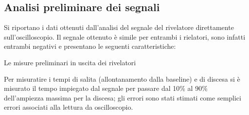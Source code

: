 
%
\subsection{Analisi preliminare dei segnali}

Si riportano i dati ottenuti dall'analisi del segnale del rivelatore direttamente sull'oscilloscopio. Il segnale
ottenuto è simile per entrambi i rielatori, sono infatti entrambi negativi e presentano le seguenti caratteristiche:\\

%
\begin{tabella}[h]
	\centering
	
	\caption{Le misure preliminari in uscita dei rivelatori}
	\label{tab:calib_pre}
\end{tabella}
%

Per misuratire i tempi di salita (allontanamento dalla baseline) e di discesa si è misurato il tempo impiegato dal segnale per passare dal 10\% al 90\% dell'ampiezza
massima per la discesa; gli errori sono stati stimati come semplici errori associati alla lettura da oscilloscopio.\\


